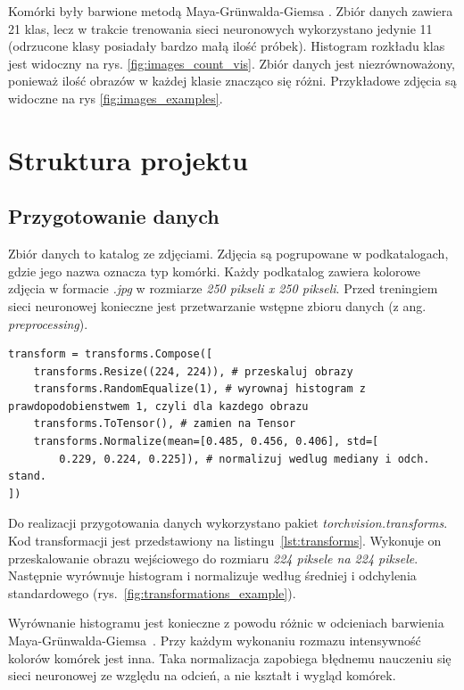 Komórki były barwione metodą Maya-Grünwalda-Giemsa \cite{histology}.
Zbiór danych zawiera 21 klas, lecz w trakcie trenowania sieci neuronowych wykorzystano jedynie 11 (odrzucone klasy posiadały bardzo małą ilość próbek).
Histogram rozkładu klas jest widoczny na rys. \ref{fig:images_count_vis}.
Zbiór danych jest niezrównoważony, ponieważ ilość obrazów w każdej klasie znacząco się różni.
Przykładowe zdjęcia są widoczne na rys \ref{fig:images_examples}.


\section{Struktura projektu}

\subsection{Przygotowanie danych}

Zbiór danych to katalog ze zdjęciami.
Zdjęcia są pogrupowane w podkatalogach, gdzie jego nazwa oznacza typ komórki.
Każdy podkatalog zawiera kolorowe zdjęcia w formacie \textit{.jpg} w rozmiarze \textit{250 pikseli x 250 pikseli}.
Przed treningiem sieci neuronowej konieczne jest przetwarzanie wstępne zbioru danych (z ang. \textit{preprocessing}).

\begin{lstlisting}[language=ipython,caption={Transformacja danych}, label={lst:transforms}]
transform = transforms.Compose([
    transforms.Resize((224, 224)), # przeskaluj obrazy
    transforms.RandomEqualize(1), # wyrownaj histogram z prawdopodobienstwem 1, czyli dla kazdego obrazu
    transforms.ToTensor(), # zamien na Tensor
    transforms.Normalize(mean=[0.485, 0.456, 0.406], std=[
        0.229, 0.224, 0.225]), # normalizuj wedlug mediany i odch. stand.
])
\end{lstlisting}

Do realizacji przygotowania danych wykorzystano pakiet \textit{torchvision.transforms}.
Kod transformacji jest przedstawiony na listingu~\ref{lst:transforms}.
Wykonuje on przeskalowanie obrazu wejściowego do rozmiaru \textit{224 piksele na 224 piksele}.
Następnie wyrównuje histogram i normalizuje według średniej i odchylenia standardowego (rys.~\ref{fig:transformations_example}).

Wyrównanie histogramu jest konieczne z powodu różnic w odcieniach barwienia Maya-Grünwalda-Giemsa~\cite{stain}.
Przy każdym wykonaniu rozmazu intensywność kolorów komórek jest inna.
Taka normalizacja zapobiega błędnemu nauczeniu się sieci neuronowej ze względu na odcień, a nie kształt i wygląd komórek.


